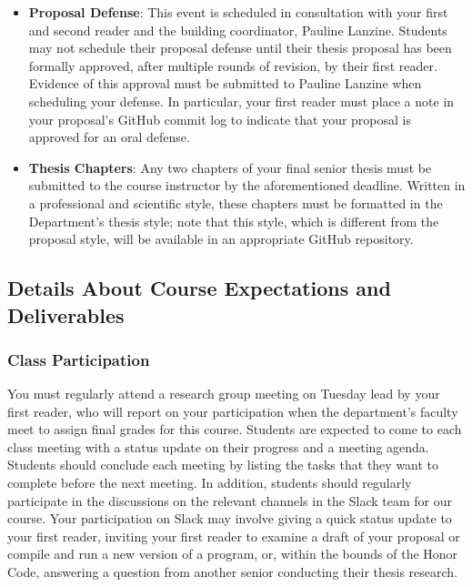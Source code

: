 \documentclass[11pt]{article}
\begin{document}
\begin{itemize}
  \item {\bf Proposal Defense}: 
  This event is scheduled in consultation with your first and second reader and the building coordinator, Pauline Lanzine. Students may not schedule their proposal defense until their thesis proposal has been formally approved, after multiple rounds of revision, by their first reader.  Evidence of this approval must be submitted to Pauline Lanzine when scheduling your defense. In particular, your first reader must place a note in your proposal's GitHub commit log to indicate that your proposal is approved for an oral defense.

  \item {\bf Thesis Chapters}: Any two chapters of your final senior thesis must be submitted to the course instructor by the aforementioned deadline. Written in a professional and scientific style, these chapters must be formatted in the Department's thesis style; note that this style, which is different from the proposal style, will be available in an appropriate GitHub repository.

\end{itemize}

\subsection*{Details About Course Expectations and Deliverables}

\subsubsection*{Class Participation}

You must regularly attend a research group meeting on Tuesday lead by your first reader, who will report on your participation when the department's faculty meet to assign final grades for this course. Students are expected to come to each class meeting with a status update on their progress and a meeting agenda. Students should conclude each meeting by listing the tasks that they want to complete before the next meeting. In addition, students should regularly participate in the discussions on the relevant channels in the Slack team for our course. Your participation on Slack may involve giving a quick status update to your first reader, inviting your first reader to examine a draft of your proposal or
compile and run a new version of a program, or, within the bounds of the Honor Code, answering a question from another senior conducting their thesis research.
\end{document}
